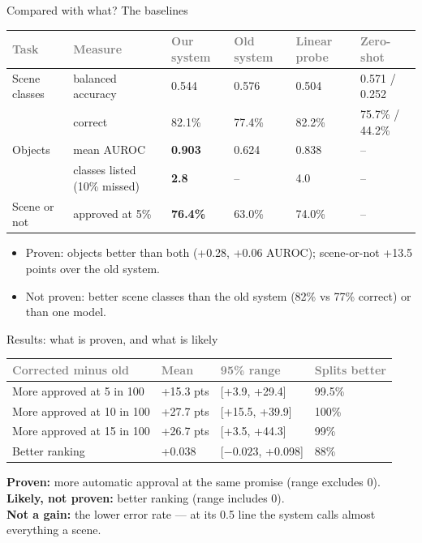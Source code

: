 \documentclass[aspectratio=169,11pt]{beamer}
\newcommand{\yes}[1]{\textcolor{accent}{\textbf{#1}}}
\newcommand{\no}[1]{\textcolor{warn}{\textbf{#1}}}
\newcommand{\h}[1]{\textcolor{grey}{#1}}
\newcommand{\remark}[1]{\par\vspace{0.35cm}{\small\textcolor{grey}{#1}}}
\begin{document}
\begin{frame}{Compared with what? The baselines}
\footnotesize
\begin{tabular}{@{}L{2.3cm} L{3.0cm} C{1.6cm} C{1.6cm} C{1.6cm} C{1.7cm}@{}}
\toprule
\h{Task} & \h{Measure} & \h{Our system} & \h{Old system} & \h{Linear probe} & \h{Zero-shot}\\
\midrule
Scene classes & balanced accuracy & 0.544 & 0.576 & 0.504 & 0.571 / 0.252\\
 & correct & 82.1\% & 77.4\% & 82.2\% & 75.7\% / 44.2\%\\
Objects & mean AUROC & \yes{0.903} & 0.624 & 0.838 & --\\
 & classes listed (10\% missed) & \yes{2.8} & -- & 4.0 & --\\
Scene or not & approved at 5\% & \yes{76.4\%} & 63.0\% & 74.0\% & --\\
\bottomrule
\end{tabular}

\vspace{0.25cm}
\begin{itemize}\setlength\itemsep{1pt}
  \item Proven: objects better than both (+0.28, +0.06 AUROC); scene-or-not +13.5 points over the old system.
  \item Not proven: better scene classes than the old system (82\% vs 77\% correct) or than one model.
\end{itemize}
\remark{Linear probe = one model's image embedding + logistic regression (standard baseline). Same pictures and 200 splits. Old system's balanced accuracy rests on 3 of 6 teaching pictures.}
\end{frame}

\begin{frame}{Results: what is proven, and what is likely}
\begin{tabular}{@{}L{5.6cm} C{2.2cm} C{2.8cm} C{1.8cm}@{}}
\toprule
\h{Corrected minus old} & \h{Mean} & \h{95\% range} & \h{Splits better}\\
\midrule
More approved at 5 in 100 & +15.3 pts & [+3.9, +29.4] & 99.5\%\\
More approved at 10 in 100 & +27.7 pts & [+15.5, +39.9] & 100\%\\
More approved at 15 in 100 & +26.7 pts & [+3.5, +44.3] & 99\%\\
\midrule
Better ranking & +0.038 & [$-0.023$, +0.098] & 88\%\\
\bottomrule
\end{tabular}

\vspace{0.4cm}
\yes{Proven:} more automatic approval at the same promise (range excludes 0).\\
\no{Likely, not proven:} better ranking (range includes 0).\\
\no{Not a gain:} the lower error rate --- at its 0.5 line the system calls almost everything a scene.
\end{frame}
\end{document}
